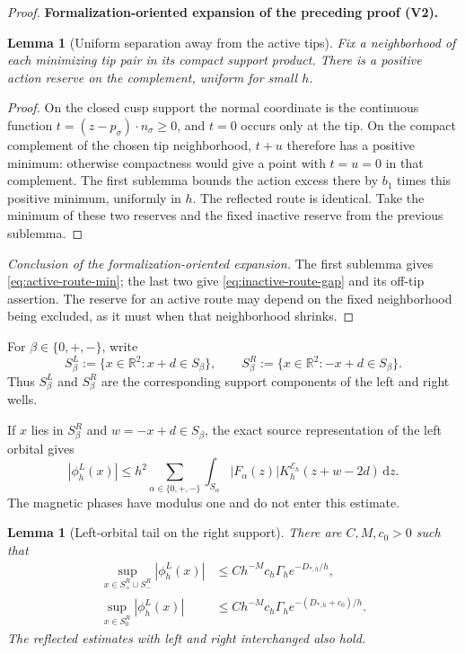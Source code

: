 \documentclass[11pt]{article}
\newtheorem{lemma}[theorem]{Lemma}
\newcommand{\formalisationparentid}{X}
\newenvironment{formalisationaddition}[1]{\par\medskip\begingroup\color{blue}\def\formalisationparentid{#1}\setcounter{formalizationsublemma}{0}\let\lemma\formalizationsublemma\let\endlemma\endformalizationsublemma
  \def\Eo{\mathcal E_h^\circ}\def\EE{\mathcal E_h}\def\phio{\phi_h^\circ}\def\phih{\phi_h}\def\Ho{H_h^{\rm atom}(v^\circ)}\def\Ha{H_h^{\rm atom}}\def\HL{H_h^{L}}\def\Dh{D_h}\def\Log{\operatorname{Log}}\def\ellh{\ell_h}\def\Gp{G_{p,h}}\def\Ast{A_{*,h}}\def\ahat{\widehat{\mathfrak a}_h}\def\ah{\mathfrak a_h}\def\rh{\widehat\rho_h}\def\deltah{\widehat\delta_h}\def\oldref##1{\textup{(##1)}}\def\interface##1{\par\noindent\textit{Analytical interface used here.} ##1\par}\def\finish{\par\noindent\textit{Conclusion of the formalization-oriented expansion.} }\par\noindent\textbf{Formalization-oriented expansion of the preceding proof (V2).}\par\smallskip
}{\par\endgroup\medskip
}
\newcommand{\R}{\mathbb R}
\newcommand{\dd}{\,\mathrm d}
\newcommand{\cE}{\mathcal E}
\begin{document}
\begin{proof}
\begin{formalisationaddition}{L8.1}
\begin{lemma}[Uniform separation away from the active tips]\label{sublemma:L8-1-off-tip}
Fix a neighborhood of each minimizing tip pair in its compact support product. There is a positive action reserve on the complement, uniform for small $h$.
\end{lemma}
\begin{proof}
On the closed cusp support the normal coordinate is the continuous function $t=(z-p_\sigma)\cdot n_\sigma\ge0$, and $t=0$ occurs only at the tip. On the compact complement of the chosen tip neighborhood, $t+u$ therefore has a positive minimum: otherwise compactness would give a point with $t=u=0$ in that complement. The first sublemma bounds the action excess there by $b_1$ times this positive minimum, uniformly in $h$. The reflected route is identical. Take the minimum of these two reserves and the fixed inactive reserve from the previous sublemma.
\end{proof}
\finish The first sublemma gives \eqref{eq:active-route-min}; the last two give \eqref{eq:inactive-route-gap} and its off-tip assertion. The reserve for an active route may depend on the fixed neighborhood being excluded, as it must when that neighborhood shrinks.
\end{formalisationaddition}

\end{proof}

For $\beta\in\{0,+,-\}$, write
\begin{equation}\label{eq:translated-supports}
 S_\beta^L:=\{x\in\R^2:x+d\in S_\beta\},
 \qquad
 S_\beta^R:=\{x\in\R^2:-x+d\in S_\beta\}.
\end{equation}
Thus $S_\beta^L$ and $S_\beta^R$ are the corresponding support components of
the left and right wells.

If $x$ lies in $S_\beta^R$ and $w=-x+d\in S_\beta$, the exact
source representation of the left orbital gives
\begin{equation}\label{eq:left-tail-route-representation}
 |\phi_h^L(x)|
 \le h^2\sum_{\alpha\in\{0,+,-\}}
 \int_{S_\alpha}|F_\alpha(z)|
 K_h^{\cE_h}(z+w-2d)\dd z.
\end{equation}
The magnetic phases have modulus one and do not enter this estimate.

\begin{lemma}[Left-orbital tail on the right support]
\label{lem:right-support-tail}
There are $C,M,c_0>0$ such that
\begin{align}
 \sup_{x\in S_+^R\cup S_-^R}|\phi_h^L(x)|
 &\le Ch^{-M}c_h\Gamma_h
 e^{-D_{*,h}/h},
 \label{eq:tail-right-cusps}\\
 \sup_{x\in S_0^R}|\phi_h^L(x)|
 &\le Ch^{-M}c_h\Gamma_h
 e^{-(D_{*,h}+c_0)/h}.
 \label{eq:tail-right-core}
\end{align}
The reflected estimates with left and right interchanged also hold.
\end{lemma}
\end{document}
